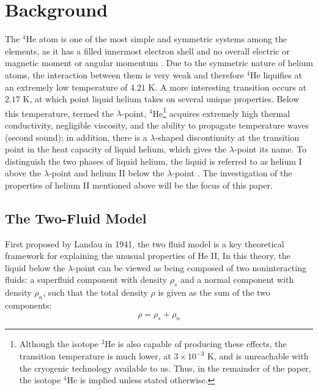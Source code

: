 
\section{Background}\label{background}

The $^4$He atom is one of the most simple and symmetric systems
among the elements, as it has a filled innermost electron shell and no
overall electric or magnetic moment or angular momentum
\cite{atkins}. Due to the symmetric nature of helium atoms, the
interaction between them is very weak and therefore $^4$He liquifies
at an extremely low temperature of $4.21$ K. A more
interesting transition occurs at $2.17$ K, at which point liquid
helium takes on several unique properties. Below this temperature,
termed the $\lambda$-point, $^4$He\footnote{Although the isotope
  $^3$He is also capable of producing these effects, the transition
  temperature is much lower, at $3\times 10^{-3}$ K, and is
  unreachable with the cryogenic technology available to us. Thus, in
  the remainder of the paper, the isotope $^4$He is implied unless
  stated otherwise.}  acquires extremely high thermal conductivity,
negligible viscosity, and the ability to propagate temperature waves
(second sound); in addition, there is a $\lambda$-shaped discontinuity
at the transition point in the heat capacity of liquid helium, which
gives the $\lambda$-point its name. To distinguish the two phases of
liquid helium, the liquid is referred to as helium I above the
$\lambda$-point and helium II below the $\lambda$-point
\cite{tilley}. The investigation of the properties of helium II
mentioned above will be the focus of this paper.

\subsection{The Two-Fluid Model}\label{thetwofluidmodel}

First proposed by Landau in 1941\cite{landau}, the two fluid model 
is a key theoretical framework for explaining the
unusual properties of He II, In this theory, the liquid below the $\lambda$-point
can be viewed as being composed of two noninteracting fluids: a
superfluid component with density $\rho_s$ and a normal component with
density $\rho_n$, such that the total density $\rho$ is given as the
sum of the two components:
\begin{equation}
\rho = \rho_s + \rho_n
\label{eqn:density}
\end{equation}

